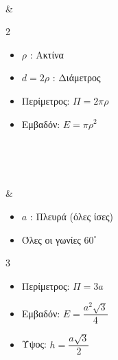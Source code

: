 \begin{center}
\begin{longtblr}
{\\
} & {
\begin{multicols}{2}
\vspace{-4mm}\begin{itemize}[noitemsep]
\item $\rho$ : Ακτίνα
\item $d=2\rho$ : Διάμετρος
\end{itemize}
\vspace{-4mm}\begin{itemize}[noitemsep]
\item  Περίμετρος: $\Pi=2\pi\rho$
\item  Εμβαδόν: $E=\pi\rho^2$
\end{itemize}
\end{multicols}}\\
{\\
} & {\vspace{-4mm}\begin{itemize}[noitemsep]
\item $a$ : Πλευρά (όλες ίσες)
\item Όλες οι γωνίες $60^\circ$
\end{itemize}
\vspace{-4mm}
\begin{multicols}{3}
\begin{itemize}[noitemsep]
\item  Περίμετρος: $\Pi=3a$
\item  Εμβαδόν: $E=\dfrac{a^2\sqrt{3}}{4}$
\item  Ύψος: $h=\dfrac{a\sqrt{3}}{2}$
\end{itemize}
\end{multicols}}\\


\end{longtblr}
\end{center}
